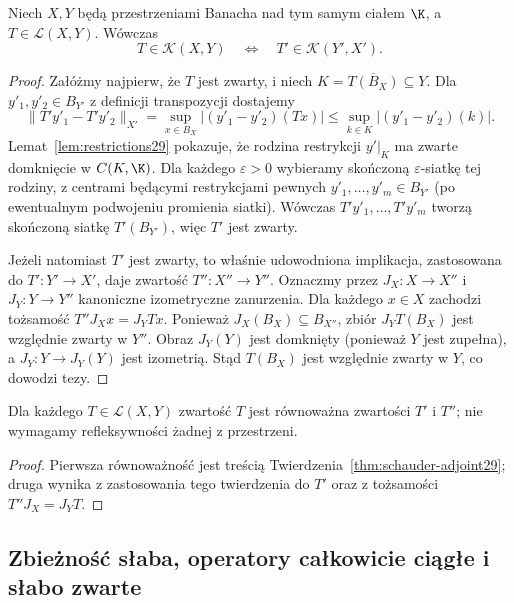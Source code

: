 \begin{twierdzenie}
\label{thm:schauder-adjoint29}
Niech $X,Y$ będą przestrzeniami Banacha nad tym samym ciałem
$\K$, a $T\in\mathcal L(X,Y)$. Wówczas
\[
T\in\mathcal K(X,Y)\quad\Longleftrightarrow\quad
T'\in\mathcal K(Y',X').
\]
\end{twierdzenie}
\begin{proof}
Załóżmy najpierw, że $T$ jest zwarty, i niech
$K=\overline{T(B_X)}\subseteq Y$. Dla $y'_1,y'_2\in B_{Y'}$
z definicji transpozycji dostajemy
\[
\|T'y'_1-T'y'_2\|_{X'}
=\sup_{x\in B_X}|(y'_1-y'_2)(Tx)|
\le\sup_{k\in K}|(y'_1-y'_2)(k)|.
\]
Lemat~\ref{lem:restrictions29} pokazuje, że rodzina
restrykcji $y'|_K$ ma zwarte domknięcie w $C(K,\K)$.
Dla każdego $\varepsilon>0$ wybieramy skończoną
$\varepsilon$-siatkę tej rodziny, z centrami będącymi
restrykcjami pewnych $y'_1,\ldots,y'_m\in B_{Y'}$
(po ewentualnym podwojeniu promienia siatki).
Wówczas $T'y'_1,\ldots,T'y'_m$ tworzą skończoną
siatkę $T'(B_{Y'})$, więc $T'$ jest zwarty.

Jeżeli natomiast $T'$ jest zwarty, to właśnie udowodniona
implikacja, zastosowana do $T':Y'\to X'$, daje zwartość
$T'':X''\to Y''$. Oznaczmy przez $J_X:X\to X''$ i
$J_Y:Y\to Y''$ kanoniczne izometryczne zanurzenia.
Dla każdego $x\in X$ zachodzi tożsamość
$T''J_Xx=J_YTx$. Ponieważ $J_X(B_X)\subseteq B_{X''}$,
zbiór $J_YT(B_X)$ jest względnie zwarty w $Y''$.
Obraz $J_Y(Y)$ jest domknięty (ponieważ $Y$ jest zupełna),
a $J_Y:Y\to J_Y(Y)$ jest izometrią. Stąd $T(B_X)$
jest względnie zwarty w $Y$, co dowodzi tezy.
\end{proof}

\begin{wniosek}
\label{cor:schauder-iterated29}
Dla każdego $T\in\mathcal L(X,Y)$ zwartość $T$ jest
równoważna zwartości $T'$ i $T''$; nie wymagamy
refleksywności żadnej z przestrzeni.
\end{wniosek}
\begin{proof}
Pierwsza równoważność jest treścią
Twierdzenia~\ref{thm:schauder-adjoint29}; druga wynika
z zastosowania tego twierdzenia do $T'$ oraz z tożsamości
$T''J_X=J_YT$.
\end{proof}

\subsection{Zbieżność słaba, operatory całkowicie ciągłe i słabo zwarte}

